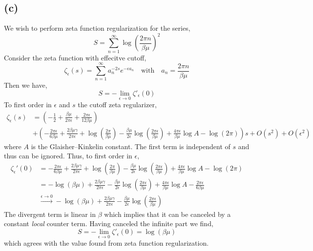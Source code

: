 \documentclass[12pt]{article}
\begin{document}
\subsection{(c)}

We wish to perform zeta function regularization for the series,
\[ S = \sum_{n = 1}^\infty \log{\left( \frac{2 \pi n}{\beta \mu} \right)^2} \]
Consider the zeta function with effecitve cutoff,
\[ \zeta_{\epsilon}(s) = \sum_{n = 1}^\infty a_n^{-2s} e^{- \epsilon a_n} \quad \text{with} \quad a_n = \frac{2 \pi n}{\beta \mu} \] 
Then we have,
\[ S = - \lim_{\epsilon \to 0} \zeta'_{\epsilon}(0) \]
To first order in $\epsilon$ and $s$ the cutoff zeta regularizer, 
\begin{align*}
\zeta_{\epsilon}(s) & = \left( - \frac{1}{2} + \frac{\beta \mu}{2 \pi \epsilon} + \frac{2 \pi \epsilon}{12 \beta \mu} \right) 
\\
& + \left( - \frac{2 \pi \epsilon}{6 \beta \mu} + \frac{2 \beta \mu \gamma}{2 \pi \epsilon} + \log{\left(\frac{2\pi}{\beta \mu}\right)} - \frac{\beta \mu}{2 \epsilon} \log{\left(\frac{2 \pi \epsilon}{\beta \mu}\right)} + \frac{4\pi \epsilon}{\beta \mu} \log{A} - \log{(2 \pi)} \right) s + O(s^2) +  O(\epsilon^2) 
\end{align*} 
where $A$ is the Glaisher–Kinkelin constant.
The first term is independent of $s$ and thus can be ignored. Thus, to first order in $\epsilon$,
\begin{align*}
\zeta_{\epsilon}'(0) & =  - \frac{2 \pi \epsilon}{6 \beta \mu} + \frac{2 \beta \mu \gamma}{2 \pi \epsilon} + \log{\left(\frac{2\pi}{\beta \mu}\right)} - \frac{\beta \mu}{2 \epsilon} \log{\left(\frac{2 \pi \epsilon}{\beta \mu}\right)} + \frac{4\pi \epsilon}{\beta \mu} \log{A} - \log{(2 \pi)} 
\\
& = - \log{(\beta \mu)} + \frac{2 \beta \mu \gamma}{2 \pi \epsilon} - \frac{\beta \mu}{2 \epsilon} \log{\left(\frac{2 \pi \epsilon}{\beta \mu}\right)} + \frac{4\pi \epsilon}{\beta \mu} \log{A} - \frac{2 \pi \epsilon}{6 \beta \mu}
\\
& \xrightarrow{\epsilon \to 0} - \log{(\beta \mu)} + \frac{2 \beta \mu \gamma}{2 \pi \epsilon} - \frac{\beta \mu}{2 \epsilon} \log{\left(\frac{2 \pi \epsilon}{\beta \mu}\right)}
\end{align*} 
The divergent term is linear in $\beta$ which implies that it can be canceled by a constant \textit{local} counter term. Having canceled the infinite part we find,
\[ S = - \lim_{\epsilon \to 0} \zeta'_{\epsilon}(0) = \log{(\beta \mu)} \]
which agrees with the value found from zeta function regularization.
\end{document}
